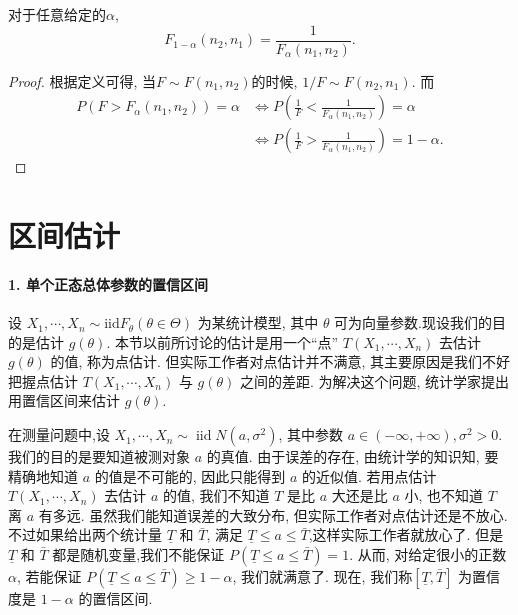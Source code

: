 \begin{corollary}
    对于任意给定的$\alpha$, 
    \[
        F_{1-\alpha}(n_2, n_1)=\frac{1}{F_\alpha(n_1, n_2)}.     
    \]
\end{corollary}

\begin{proof}
    根据定义可得, 当$F\sim F(n_1, n_2)$的时候, $1/F\sim F(n_2, n_1)$. 而
    \[
        \begin{aligned}
            P(F>F_\alpha(n_1, n_2))=\alpha &\iff P(\frac1F<\frac1{F_\alpha(n_1, n_2)})=\alpha \\
            &\iff P(\frac1F>\frac1{F_\alpha(n_1, n_2)})=1-\alpha .
        \end{aligned}
    \]
\end{proof}

\section{区间估计}


\paragraph{1. 单个正态总体参数的置信区间}
设 $X_1, \cdots, X_n \sim \mathrm{iid} F_\theta(\theta \in \Theta)$ 为某统计模型, 其中 $\theta$ 可为向量参数.现设我们的目的是估计 $g(\theta)$. 本节以前所讨论的估计是用一个``点'' $T\left(X_1, \cdots, X_n\right)$ 去估计 $g(\theta)$ 的值, 称为点估计. 但实际工作者对点估计并不满意, 其主要原因是我们不好把握点估计 $T\left(X_1, \cdots, X_n\right)$ 与 $g(\theta)$ 之间的差距. 为解决这个问题, 统计学家提出用置信区间来估计 $g(\theta)$. 

\begin{example}
    在测量问题中,设 $X_1, \cdots, X_n \sim \operatorname{iid} N\left(a, \sigma^2\right)$, 其中参数 $a \in(-\infty,+\infty), \sigma^2>0$. 我们的目的是要知道被测对象 $a$ 的真值. 由于误差的存在, 由统计学的知识知, 要精确地知道 $a$ 的值是不可能的, 因此只能得到 $a$ 的近似值. 若用点估计 $T\left(X_1, \cdots, X_n\right)$ 去估计 $a$ 的值, 我们不知道 $T$ 是比 $a$ 大还是比 $a$ 小, 也不知道 $T$ 离 $a$ 有多远. 虽然我们能知道误差的大致分布, 但实际工作者对点估计还是不放心. 不过如果给出两个统计量 $\underline T$ 和 $\bar{T}$, 满足 $\underline T \leq a \leq\bar{T}$,这样实际工作者就放心了. 但是 $\underline{T}$ 和 $\bar{T}$ 都是随机变量,我们不能保证 $P(\underline{T} \leq a \leq \bar{T})=1$. 从而, 对给定很小的正数 $\alpha$, 若能保证 $P(\underline{T} \leq a \leq \bar T)\geq 1-\alpha $, 我们就满意了. 现在, 我们称$[\underline T, \bar{T}]$ 为置信度是 $1-\alpha$ 的置信区间.
\end{example}

